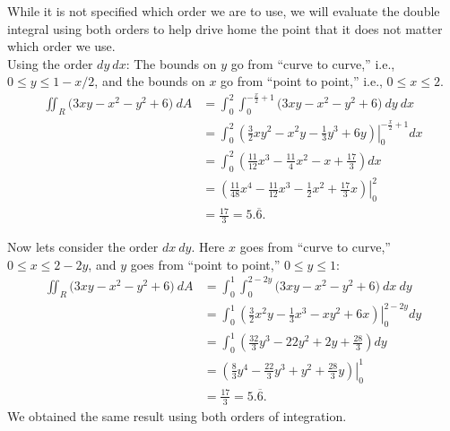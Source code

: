{While it is not specified which order we are to use, we will evaluate the double integral using both orders to help drive home the point that it does not matter which order we use.\\

Using the order $dy\ dx$:
The bounds on $y$ go from ``curve to curve,'' i.e., $0\leq y\leq 1-x/2$, and the bounds on $x$ go from ``point to point,'' i.e., $0\leq x\leq 2$.
\begin{align*}
\iint_R (3xy-x^2-y^2+6\big)\ dA &= \int_0^2\int_0^{-\frac x2+1} (3xy-x^2-y^2+6\big)\ dy\ dx\\
		&= \int_0^2\left.\left(\frac32xy^2-x^2y-\frac13y^3+6y\right)\right|_0^{-\frac x2+1}dx\\
		&= \int_0^2 \left(\frac{11}{12}x^3-\frac{11}{4}x^2-x+\frac{17}3\right)dx \\
		&= \left.\left(\frac{11}{48}x^4-\frac{11}{12}x^3-\frac12x^2+\frac{17}3x\right)\right|_0^2\\
		&= \frac{17}3=5.\overline{6}.
\end{align*}

Now lets consider the order $dx \ dy$. Here $x$ goes from ``curve to curve,'' $0\leq x\leq 2-2y$, and $y$ goes from ``point to point,'' $0\leq y\leq 1$:
\begin{align*}
\iint_R (3xy-x^2-y^2+6\big)\ dA &= \int_0^1\int_0^{2-2y} (3xy-x^2-y^2+6\big)\ dx\ dy\\
		&= \int_0^1\left.\left(\frac32x^2y-\frac13x^3-xy^2+6x\right)\right|_0^{2-2y} dy\\
		&= \int_0^1\left(\frac{32}3y^3-22y^2+2y+\frac{28}3\right)dy\\
		&=\left.\left(\frac83y^4-\frac{22}3y^3+y^2+\frac{28}3y\right)\right|_0^1\\
		&=\frac{17}3=5.\overline{6}.
\end{align*}
We obtained the same result using both orders of integration. 
}\\

